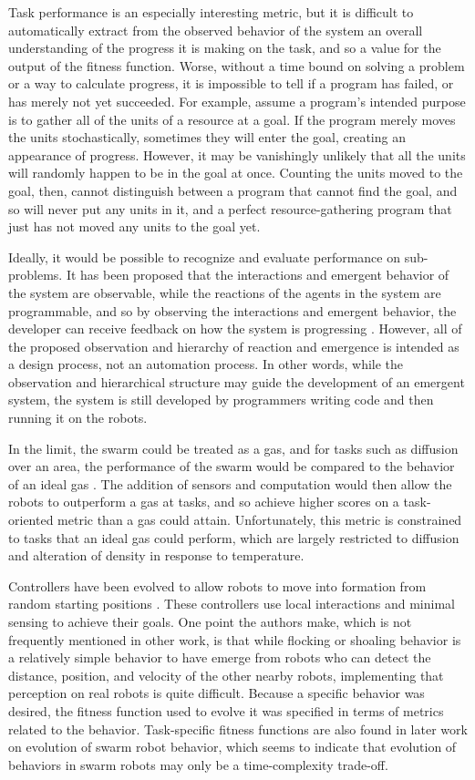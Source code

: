 Task performance is an especially interesting metric, but it is difficult to automatically extract from the observed behavior of the system an overall understanding of the progress it is making on the task, and so a value for the output of the fitness function. 
Worse, without a time bound on solving a problem or a way to calculate progress, it is impossible to tell if a program has failed, or has merely not yet succeeded.
For example, assume a program's intended purpose is to gather all of the units of a resource at a goal. 
If the program merely moves the units stochastically, sometimes they will enter the goal, creating an appearance of progress. 
However, it may be vanishingly unlikely that all the units will randomly happen to be in the goal at once. 
Counting the units moved to the goal, then, cannot distinguish between a program that cannot find the goal, and so will never put any units in it, and a perfect resource-gathering program that just has not moved any units to the goal yet.
 
Ideally, it would be possible to recognize and evaluate performance on sub-problems. 
It has been proposed that the interactions and emergent behavior of the system are observable, while the reactions of the agents in the system are programmable, and so by observing the interactions and emergent behavior, the developer can receive feedback on how the system is progressing \citep{palmer2005behavioral}. 
However, all of the proposed observation and hierarchy of reaction and emergence is intended as a design process, not an automation process. 
In other words, while the observation and hierarchical structure may guide the development of an emergent system, the system is still developed by programmers writing code and then running it on the robots.

In the limit, the swarm could be treated as a gas, and for tasks such as diffusion over an area, the performance of the swarm would be compared to the behavior of an ideal gas \citep{jantz1997kinetics}.
The addition of sensors and computation would then allow the robots to outperform a gas at tasks, and so achieve higher scores on a task-oriented metric than a gas could attain. 
Unfortunately, this metric is constrained to tasks that an ideal gas could perform, which are largely restricted to diffusion and alteration of density in response to temperature. 

Controllers have been evolved to allow robots to move into formation from random starting positions \citep{quinn2003evolving}. 
These controllers use local interactions and minimal sensing to achieve their goals. 
One point the authors make, which is not frequently mentioned in other work, is that while flocking or shoaling behavior is a relatively simple behavior to have emerge from robots who can detect the distance, position, and velocity of the other nearby robots, implementing that perception on real robots is quite difficult.
Because a specific behavior was desired, the fitness function used to evolve it was specified in terms of metrics related to the behavior. 
Task-specific fitness functions are also found in later work on evolution of swarm robot behavior, which seems to indicate that evolution of behaviors in swarm robots may only be a time-complexity trade-off. 

